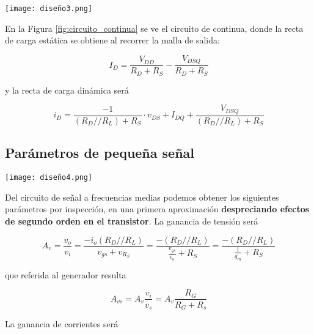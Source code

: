 \documentclass[a4paper, 10pt, spanish]{article}
\begin{document}
\begin{center}
           \texttt{[image: diseño3.png]}
           \label{fig:circuito_continua}
\end{center}

En la Figura \ref{fig:circuito_continua} se ve el circuito de continua, donde la recta de carga estática se obtiene al recorrer la malla de salida:

\begin{equation}
	I_D = \frac{V_{DD}}{R_D + R_S} - \frac{V_{DSQ}}{R_D + R_S}
	\end{equation}

y la recta de carga dinámica será

\begin{equation}
	i_D = \frac{-1}{(R_D//R_L) + R_S}\cdot v_{DS} + I_{DQ} + \frac{V_{DSQ}}{(R_D//R_L) + R_S}
	\end{equation}


\subsection{Parámetros de pequeña señal}



\begin{center}
           \texttt{[image: diseño4.png]}
           \label{fig:circuito_señal}
\end{center}



Del circuito de señal a frecuencias medias podemos obtener los siguientes parámetros por inspección, en una primera aproximación \textbf{despreciando efectos de segundo orden en el transistor}.
La ganancia de tensión será

\begin{equation}
A_v = \frac{v_o}{v_i} = \frac{-i_o(R_D // R_L)}{v_{gs}+ v_{R_S}} = \frac{-(R_D//R_L)}{\frac{v_{gs}}{i_o}+R_S} = \frac{-(R_D//R_L)}{\frac{1}{g_m}+R_S}
\end{equation}

que referida al generador resulta

\begin{equation}
A_{vs} = A_v \frac{v_i}{v_s} = A_v \frac{R_G}{R_G + R_s}
\end{equation}

La ganancia de corrientes será
\end{document}
